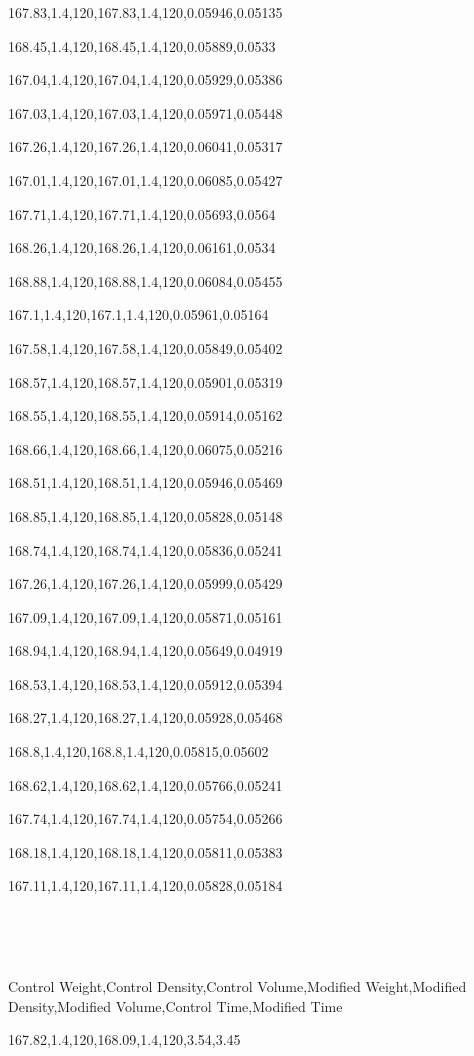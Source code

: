 167.83,1.4,120,167.83,1.4,120,0.05946,0.05135

168.45,1.4,120,168.45,1.4,120,0.05889,0.0533

167.04,1.4,120,167.04,1.4,120,0.05929,0.05386

167.03,1.4,120,167.03,1.4,120,0.05971,0.05448

167.26,1.4,120,167.26,1.4,120,0.06041,0.05317

167.01,1.4,120,167.01,1.4,120,0.06085,0.05427

167.71,1.4,120,167.71,1.4,120,0.05693,0.0564

168.26,1.4,120,168.26,1.4,120,0.06161,0.0534

168.88,1.4,120,168.88,1.4,120,0.06084,0.05455

167.1,1.4,120,167.1,1.4,120,0.05961,0.05164

167.58,1.4,120,167.58,1.4,120,0.05849,0.05402

168.57,1.4,120,168.57,1.4,120,0.05901,0.05319

168.55,1.4,120,168.55,1.4,120,0.05914,0.05162

168.66,1.4,120,168.66,1.4,120,0.06075,0.05216

168.51,1.4,120,168.51,1.4,120,0.05946,0.05469

168.85,1.4,120,168.85,1.4,120,0.05828,0.05148

168.74,1.4,120,168.74,1.4,120,0.05836,0.05241

167.26,1.4,120,167.26,1.4,120,0.05999,0.05429

167.09,1.4,120,167.09,1.4,120,0.05871,0.05161

168.94,1.4,120,168.94,1.4,120,0.05649,0.04919

168.53,1.4,120,168.53,1.4,120,0.05912,0.05394

168.27,1.4,120,168.27,1.4,120,0.05928,0.05468

168.8,1.4,120,168.8,1.4,120,0.05815,0.05602

168.62,1.4,120,168.62,1.4,120,0.05766,0.05241

167.74,1.4,120,167.74,1.4,120,0.05754,0.05266

168.18,1.4,120,168.18,1.4,120,0.05811,0.05383

167.11,1.4,120,167.11,1.4,120,0.05828,0.05184





Control Weight,Control Density,Control Volume,Modified Weight,Modified
Density,Modified Volume,Control Time,Modified Time

167.82,1.4,120,168.09,1.4,120,3.54,3.45

